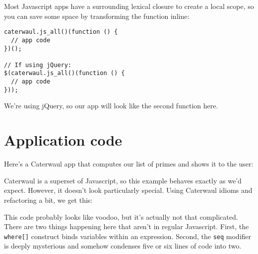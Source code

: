 \documentclass{report}
\begin{document}
    Most Javascript apps have a surrounding lexical closure to create a local scope, so you can save some space by transforming the function inline:

\begin{verbatim}
caterwaul.js_all()(function () {
  // app code
})();

// If using jQuery:
$(caterwaul.js_all()(function () {
  // app code
}));
\end{verbatim}

    We're using jQuery, so our app will look like the second function here.

\section{Application code}
    Here's a Caterwaul app that computes our list of primes and shows it to the user:


    Caterwaul is a superset of Javascript, so this example behaves exactly as we'd expect. However, it doesn't look particularly special. Using Caterwaul idioms and refactoring a bit, we get
    this:


    This code probably looks like voodoo, but it's actually not that complicated. There are two things happening here that aren't in regular Javascript. First, the {\tt where[]} construct
    binds variables within an expression. Second, the {\tt seq} modifier is deeply mysterious and somehow condenses five or six lines of code into two.
\end{document}

